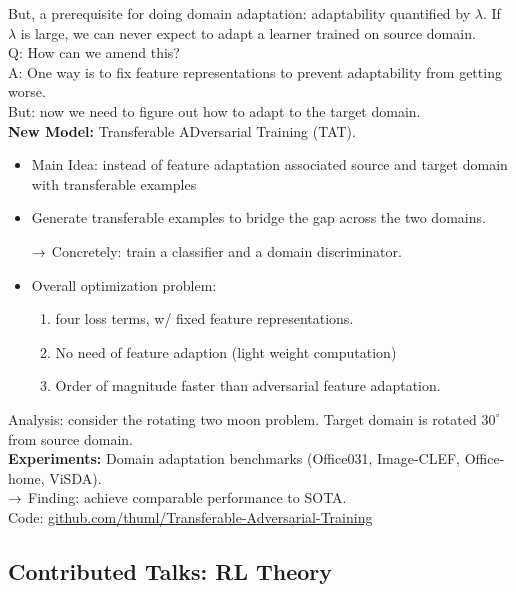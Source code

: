 But, a prerequisite for doing domain adaptation: adaptability quantified by $\lambda$. If $\lambda$ is large, we can never expect to adapt a learner trained on source domain. \\

Q: How can we amend this? \\

A: One way is to fix feature representations to prevent adaptability from getting worse. \\

But: now we need to figure out how to adapt to the target domain. \\

{\bf New Model:} Transferable ADversarial Training (TAT).
\begin{itemize}
    \item Main Idea: instead of feature adaptation associated source and target domain with transferable examples
    \item Generate transferable examples to bridge the gap across the two domains.
    
    $\rightarrow$ Concretely: train a classifier and a domain discriminator.
    \item Overall optimization problem: 
    \begin{enumerate}
        \item four loss terms, w/ fixed feature representations.
        \item  No need of feature adaption (light weight computation)
        \item Order of magnitude faster than adversarial feature adaptation.
    \end{enumerate} 
\end{itemize}

Analysis: consider the rotating two moon problem. Target domain is rotated $30^\circ$ from source domain. \\

{\bf Experiments:} Domain adaptation benchmarks (Office031, Image-CLEF, Office-home, ViSDA). \\

$\rightarrow$ Finding: achieve comparable performance to SOTA. \\

Code: \url{github.com/thuml/Transferable-Adversarial-Training}

\spacerule

\subsection{Contributed Talks: RL Theory}

